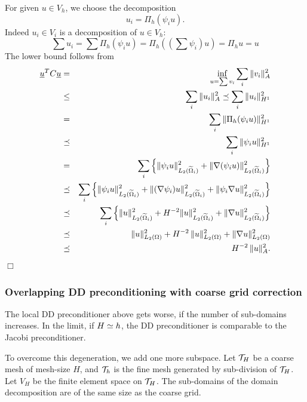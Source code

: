 For given $u \in V_h$, we choose the decomposition
$$
u_i = \Pi_h (\psi_i u).
$$
Indeed $u_i \in V_i$ is a decomposition of $u \in V_h$:
$$
\sum u_i = \sum \Pi_h (\psi_i u) = 
\Pi_h \left( (\sum \psi_i) u \right) = \Pi_h u = u
$$
The lower bound follows from
\begin{eqnarray*}
\underline u^T C \underline u & = & \inf_{u = \sum v_i} \sum_i \| v_i \|_A^2 \\
        & \leq & \sum_i \| u_i \|_A^2 \preceq \sum_i \| u_i \|_{H^1}^2 \\
        & = & \sum_i \| \Pi_h (\psi_i u) \|_{H^1}^2 \\
        & \preceq & \sum_i \| \psi_i u \|_{H^1}^2 \\
        & = & \sum_i
         \left\{ 
        \| \psi_i u \|_{L_2(\widetilde \Omega_i)}^2 +
         \| \nabla (\psi_i u) \|_{L_2(\widetilde \Omega_i)}^2 \right\} \\
        & \preceq & \sum_i
         \left\{ \| \psi_i u \|_{L_2(\widetilde \Omega_i)}^2 +
         \| (\nabla \psi_i) u \|_{L_2(\widetilde \Omega_i)}^2 +
         \| \psi_i \nabla u \|_{L_2(\widetilde \Omega_i)}^2 \right\} \\
        & \preceq & \sum_i
         \left\{ \| u \|_{L_2(\widetilde \Omega_i)}^2 +
         H^{-2} \| u \|_{L_2(\widetilde \Omega_i)}^2 +
         \| \nabla u \|_{L_2(\widetilde \Omega_i)}^2 \right\} \\
        & \preceq & \| u \|_{L_2(\Omega)}^2 + H^{-2} \, \| u \|_{L_2(\Omega)}^2
        + \| \nabla u \|_{L_2(\Omega)}^2 \\
        & \preceq & H^{-2} \, \| u \|_A^2.
\end{eqnarray*}
\hfill $\Box$

\bigskip

\subsubsection{Overlapping DD preconditioning with coarse grid correction}

The local DD preconditioner above gets worse, if the number of sub-domains
increases. In the limit, if $H \simeq h$, the DD preconditioner is comparable 
to the Jacobi preconditioner. 

To overcome this degeneration, we add one more subspace. Let ${\cal T}_H$
be a coarse mesh of mesh-size $H$, and ${\cal T}_h$ is the fine mesh 
generated by sub-division of ${\cal T}_H$. Let $V_H$ be the finite element
space on ${\cal T}_H$. 
The sub-domains of the
domain decomposition are of the same size as the coarse grid.

